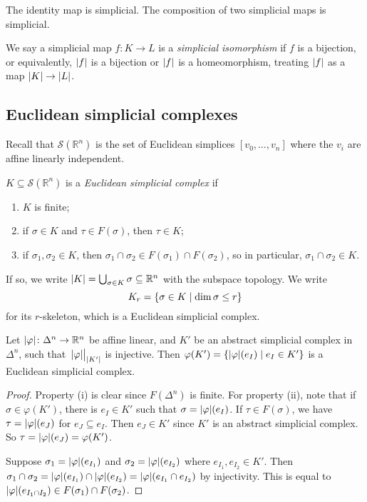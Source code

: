 \begin{remark}
	The identity map is simplicial.
	The composition of two simplicial maps is simplicial.
\end{remark}
\begin{definition}
	We say a simplicial map \( f \colon K \to L \) is a \emph{simplicial isomorphism} if \( f \) is a bijection, or equivalently, \( \abs{f} \) is a bijection or \( \abs{f} \) is a homeomorphism, treating \( \abs{f} \) as a map \( \abs{K} \to \abs{L} \).
\end{definition}

\subsection{Euclidean simplicial complexes}
Recall that \( \mathcal S(\mathbb R^n) \) is the set of Euclidean simplices \( [v_0, \dots, v_n] \) where the \( v_i \) are affine linearly independent.
\begin{definition}
	\( K \subseteq \mathcal S(\mathbb R^n) \) is a \emph{Euclidean simplicial complex} if
	\begin{enumerate}
		\item \( K \) is finite;
		\item if \( \sigma \in K \) and \( \tau \in F(\sigma) \), then \( \tau \in K \);
		\item if \( \sigma_1, \sigma_2 \in K \), then \( \sigma_1 \cap \sigma_2 \in F(\sigma_1) \cap F(\sigma_2) \), so in particular, \( \sigma_1 \cap \sigma_2 \in K \).
	\end{enumerate}
	If so, we write \( \abs{K} = \bigcup_{\sigma \in K} \sigma \subseteq \mathbb R^n \) with the subspace topology.
	We write
	\[ K_r = \qty{\sigma \in K \mid \dim \sigma \leq r} \]
	for its \( r \)-skeleton, which is a Euclidean simplicial complex.
\end{definition}
\begin{proposition}
	Let \( \abs{\varphi} \colon \Delta^n \to \mathbb R^n \) be affine linear, and \( K' \) be an abstract simplicial complex in \( \Delta^n \), such that \( \eval{\abs{\varphi}}_{\abs{K'}} \) is injective.
	Then \( \varphi(K') = \qty{\abs{\varphi}(e_I) \mid e_I \in K'} \) is a Euclidean simplicial complex.
\end{proposition}
\begin{proof}
	Property (i) is clear since \( F(\Delta^n) \) is finite.
	For property (ii), note that if \( \sigma \in \varphi(K') \), there is \( e_I \in K' \) such that \( \sigma = \abs{\varphi}(e_I) \).
	If \( \tau \in F(\sigma) \), we have \( \tau = \abs{\varphi}(e_J) \) for \( e_J \subseteq e_I \).
	Then \( e_J \in K' \) since \( K' \) is an abstract simplicial complex.
	So \( \tau = \abs{\varphi}(e_J) = \varphi(K') \).

	Suppose \( \sigma_1 = \abs{\varphi}(e_{I_1}) \) and \( \sigma_2 = \abs{\varphi}(e_{I_2}) \) where \( e_{I_1}, e_{I_2} \in K' \).
	Then \( \sigma_1 \cap \sigma_2 = \abs{\varphi}(e_{I_1}) \cap \abs{\varphi}(e_{I_2}) = \abs{\varphi}(e_{I_1} \cap e_{I_2}) \) by injectivity.
	This is equal to \( \abs{\varphi}(e_{I_1 \cap I_2}) \in F(\sigma_1) \cap F(\sigma_2) \).
\end{proof}
